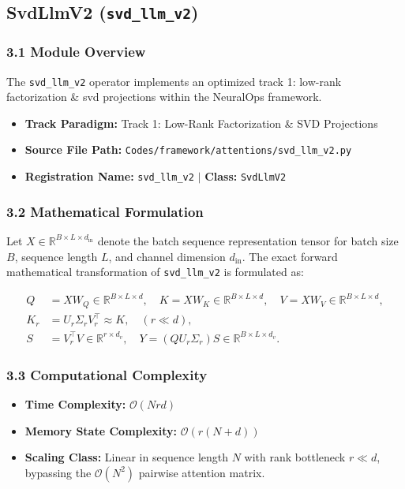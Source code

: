 \subsection{SvdLlmV2 (\texttt{svd\_llm\_v2})}
\label{sec:app_module_svd\_llm\_v2}

\subsubsection*{3.1 Module Overview}
The \texttt{svd\_llm\_v2} operator implements an optimized track 1: low-rank factorization \& svd projections within the NeuralOps framework.
\begin{itemize}
    \item \textbf{Track Paradigm:} Track 1: Low-Rank Factorization & SVD Projections
    \item \textbf{Source File Path:} \texttt{Codes/framework/attentions/svd\_llm\_v2.py}
    \item \textbf{Registration Name:} \texttt{svd\_llm\_v2} $\mid$ \textbf{Class:} \texttt{SvdLlmV2}
\end{itemize}

\subsubsection*{3.2 Mathematical Formulation}
Let $X \in \mathbb{R}^{B \times L \times d_{\text{in}}}$ denote the batch sequence representation tensor for batch size $B$, sequence length $L$, and channel dimension $d_{\text{in}}$. The exact forward mathematical transformation of \texttt{svd\_llm\_v2} is formulated as:

\begin{align}
Q &= X W_Q \in \mathbb{R}^{B \times L \times d}, \quad K = X W_K \in \mathbb{R}^{B \times L \times d}, \quad V = X W_V \in \mathbb{R}^{B \times L \times d}, \\
K_r &= U_r \Sigma_r V_r^\top \approx K, \quad (r \ll d), \\
S &= V_r^\top V \in \mathbb{R}^{r \times d_v}, \quad Y = (Q U_r \Sigma_r) S \in \mathbb{R}^{B \times L \times d_v}.
\end{align}


\subsubsection*{3.3 Computational Complexity}
\begin{itemize}
    \item \textbf{Time Complexity:} $\mathcal{O}(N r d)$
    \item \textbf{Memory State Complexity:} $\mathcal{O}(r(N + d))$
    \item \textbf{Scaling Class:} Linear in sequence length $N$ with rank bottleneck $r \ll d$, bypassing the $\mathcal{O}(N^2)$ pairwise attention matrix.
\end{itemize}

